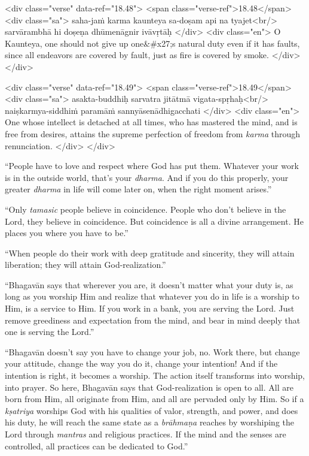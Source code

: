 \begin{html}
<div class="verse" data-ref="18.48">
  <span class="verse-ref">18.48</span>
  <div class="sa">
    saha-jaṁ karma kaunteya sa-doṣam api na tyajet<br/>
    sarvārambhā hi doṣeṇa dhūmenāgnir ivāvṛtāḥ
  </div>
  <div class="en">
    O Kaunteya, one should not give up one&#x27;s natural duty even if it has faults, since all endeavors are covered by fault, just as fire is covered by smoke.
  </div>
</div>
\end{html}



\begin{html}
<div class="verse" data-ref="18.49">
  <span class="verse-ref">18.49</span>
  <div class="sa">
    asakta-buddhiḥ sarvatra jitātmā vigata-spṛhaḥ<br/>
    naiṣkarmya-siddhiṁ paramāṁ sannyāsenādhigacchati
  </div>
  <div class="en">
    One whose intellect is detached at all times, who has mastered the mind, and is free from desires, attains the supreme perfection of freedom from \textit{karma} through renunciation.
  </div>
</div>
\end{html}



\enquote{People have to love and respect where God has put them. Whatever your work is in the outside world, that’s your \textit{dharma}. And if you do this properly, your greater \textit{dharma} in life will come later on, when the right moment arises.}

\enquote{Only \textit{tamasic} people believe in coincidence. People who don’t believe in the Lord, they believe in coincidence. But coincidence is all a divine arrangement. He places you where you have to be.}

\enquote{When people do their work with deep gratitude and sincerity, they will attain liberation; they will attain God-realization.}

\enquote{Bhagavān says that wherever you are, it doesn’t matter what your duty is, as long as you worship Him and realize that whatever you do in life is a worship to Him, is a service to Him. If you work in a bank, you are serving the Lord. Just remove greediness and expectation from the mind, and bear in mind deeply that one is serving the Lord.}

\enquote{Bhagavān doesn’t say you have to change your job, no. Work there, but change your attitude, change the way you do it, change your intention! And if the intention is right, it becomes a worship. The action itself transforms into worship, into prayer. So here, Bhagavān says that God-realization is open to all. All are born from Him, all originate from Him, and all are pervaded only by Him. So if a \textit{kṣatriya} worships God with his qualities of valor, strength, and power, and does his duty, he will reach the same state as a \textit{brāhmaṇa} reaches by worshiping the Lord through \textit{mantras} and religious practices. If the mind and the senses are controlled, all practices can be dedicated to God.}

